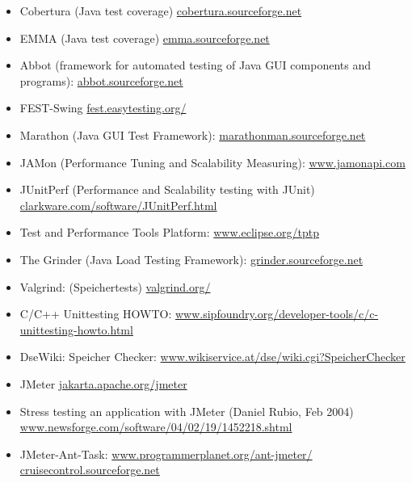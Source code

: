\begin{itemize}
\item Cobertura (Java test coverage)
 \href{http://cobertura.sourceforge.net}
         {cobertura.sourceforge.net}
\item EMMA (Java test coverage)
  \href{http://emma.sourceforge.net}{emma.sourceforge.net}
\item Abbot (framework for automated testing of Java GUI
  components and programs):
  \href{http://abbot.sourceforge.net}{abbot.sourceforge.net}
\item FEST-Swing \href{http://fest.easytesting.org/}
{fest.easytesting.org/}
\item Marathon (Java GUI Test Framework):
   \href{http://marathonman.sourceforge.net}{marathonman.sourceforge.net}
\item JAMon (Performance Tuning and Scalability Measuring):
  \href{http://www.jamonapi.com}{www.jamonapi.com}
\item JUnitPerf (Performance and Scalability testing with JUnit)
  \href{http://clarkware.com/software/JUnitPerf.html}{clarkware.com/software/JUnitPerf.html}
\item Test and Performance Tools Platform:
  \href{http://www.eclipse.org/tptp}{www.eclipse.org/tptp}
\item The Grinder (Java Load Testing Framework):
   \href{http://grinder.sourceforge.net}{grinder.sourceforge.net}
\item Valgrind: (Speichertests)
    \href{http://valgrind.org/}{valgrind.org/}
\item C/C++ Unittesting
  HOWTO:
\href{http://www.sipfoundry.org/developer-tools/c/c-unittesting-howto.html}
              {www.sipfoundry.org/developer-tools/c/c-unittesting-howto.html}
\item DseWiki: Speicher Checker:
  \href{http://www.wikiservice.at/dse/wiki.cgi?SpeicherChecker}
    {www.wikiservice.at/dse/wiki.cgi?SpeicherChecker}
\item JMeter
  \href{http://jakarta.apache.org/jmeter}{jakarta.apache.org/jmeter}
\item Stress testing an application with JMeter (Daniel Rubio, Feb 2004)\\
  \href{http://www.newsforge.com/software/04/02/19/1452218.shtml}
            {www.newsforge.com/software/04/02/19/1452218.shtml}
\item JMeter-Ant-Task: \href{http://www.programmerplanet.org/ant-jmeter/}
     {www.programmerplanet.org/ant-jmeter/}
\href{http://cruisecontrol.sourceforge.net}{cruisecontrol.sourceforge.net}


\end{itemize}
